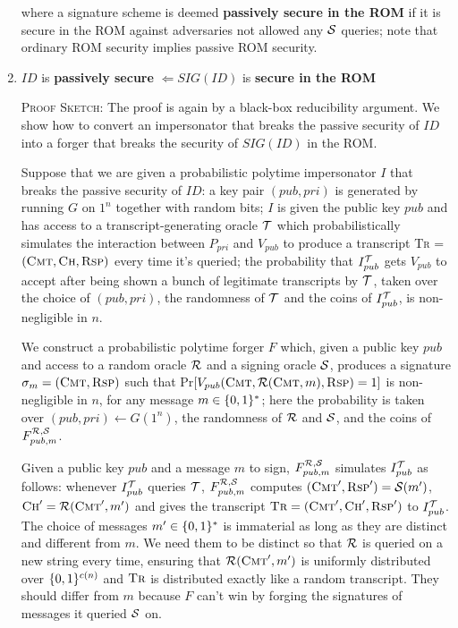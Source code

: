 \documentclass[12pt,twoside]{article}
\begin{document}
\begin{enumerate}
where a signature scheme is deemed {\bf passively secure in the ROM} if it is
secure in the ROM against adversaries not allowed any $\mathcal{S}$ queries; note
that ordinary ROM security implies passive ROM security. 

\item $ID$ is {\bf passively secure} $\Leftarrow SIG(ID)$ is {\bf secure in 
the ROM}

\textsc{Proof Sketch}: The proof is again by a black-box reducibility
argument. We show how to convert an impersonator that breaks the passive
security of $ID$ into a forger that breaks the security of $SIG(ID)$ in the
ROM. 

Suppose that we are given a probabilistic polytime 
impersonator $I$ that breaks the passive security of $ID$: a key pair 
$(pub,pri)$ is generated by running $G$ on $1^n$ together with random bits; 
$I$ is given the public key $pub$ and has access to a transcript-generating 
oracle $\mathcal{T}$ which probabilistically simulates the interaction between 
$P_{pri}$ and $V_{pub}$ to produce a transcript \textsc{Tr} = $(\textsc{Cmt},
\textsc{Ch},\textsc{Rsp})$ every time it's queried; the probability that 
$I_{pub}^{\mathcal{T}}$ gets $V_{pub}$ to accept after being shown a bunch of legitimate 
transcripts by $\mathcal{T}$, taken over the choice of $(pub,pri)$, the randomness 
of $\mathcal{T}$ and the coins of $I_{pub}^{\mathcal{T}}$, is non-negligible in $n$.

We construct a probabilistic polytime forger $F$ which, given a public key
$pub$ and access to a random oracle $\mathcal{R}$ and a signing oracle $\mathcal{S}$, 
produces a signature $\sigma_m = (\textsc{Cmt},\textsc{Rsp})$ such that 
Pr$[V_{pub}(\textsc{Cmt},\mathcal{R}(\textsc{Cmt},m),\textsc{Rsp}) = 1]$ is 
non-negligible in $n$, for any message $m \in \{0,1\}^{*}$; here the probability
is taken over $(pub,pri) \gets G(1^n)$, the randomness of $\mathcal{R}$ and
$\mathcal{S}$, and the coins of $F_{pub,m}^{\mathcal{R},\mathcal{S}}$. 

Given a public key $pub$ and a message $m$ to sign, $F^{\mathcal{R},\mathcal{S}}_{pub,m}$ 
simulates $I_{pub}^{\mathcal{T}}$ as follows: whenever $I_{pub}^{\mathcal{T}}$ queries $\mathcal{T}$,
$F^{\mathcal{R},\mathcal{S}}_{pub,m}$ computes $(\textsc{Cmt}',\textsc{Rsp}') = \mathcal{S}(m')$, 
$\textsc{Ch}' = \mathcal{R}(\textsc{Cmt}',m')$ and gives the transcript 
$\textsc{Tr} = (\textsc{Cmt}',\textsc{Ch}',\textsc{Rsp}')$ to $I_{pub}^{\mathcal{T}}$. 
The choice of messages $m' \in \{0,1\}^{*}$ is immaterial as long as they are 
distinct and different from $m$. We need them to be distinct so that $\mathcal{R}$ is 
queried on a new string every time, ensuring that $\mathcal{R}(\textsc{Cmt}',m')$ is 
uniformly distributed over $\{0,1\}^{c(n)}$ and $\textsc{Tr}$ is distributed 
exactly like a random transcript. They should differ from $m$ because $F$ can't 
win by forging the signatures of messages it queried $\mathcal{S}$ on.


\end{enumerate}
\end{document}
